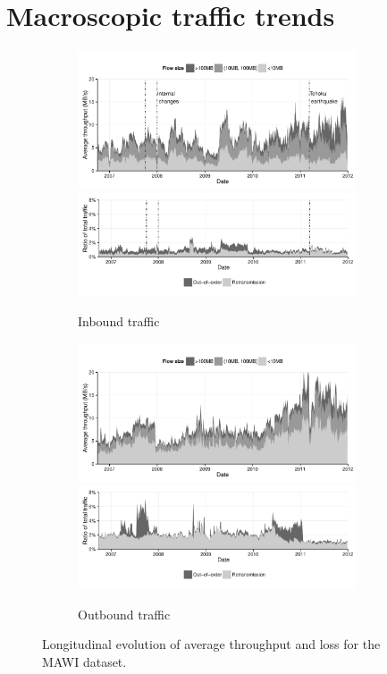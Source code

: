 \section{Macroscopic traffic trends}
\label{section:malawi:macro}

\begin{figure}
  \centering
  \begin{subfigure}[b]{1.0\linewidth}
  \includegraphics[width=0.9\textwidth]{figures/malawi/tputin}\\
  \includegraphics[width=0.9\textwidth]{figures/malawi/lossesin}
  \caption{Inbound traffic\label{fig:MAWIin}}
  \end{subfigure}
  \begin{subfigure}[b]{1.0\linewidth}
  \includegraphics[width=0.9\textwidth]{figures/malawi/tputout}\\
  \includegraphics[width=0.9\textwidth]{figures/malawi/lossesout}
  \caption{Outbound traffic\label{fig:MAWIout}}
  \end{subfigure}
  \caption{Longitudinal evolution of average throughput and loss for the \acs{MAWI} dataset.}\label{fig:MAWI}
\end{figure}

